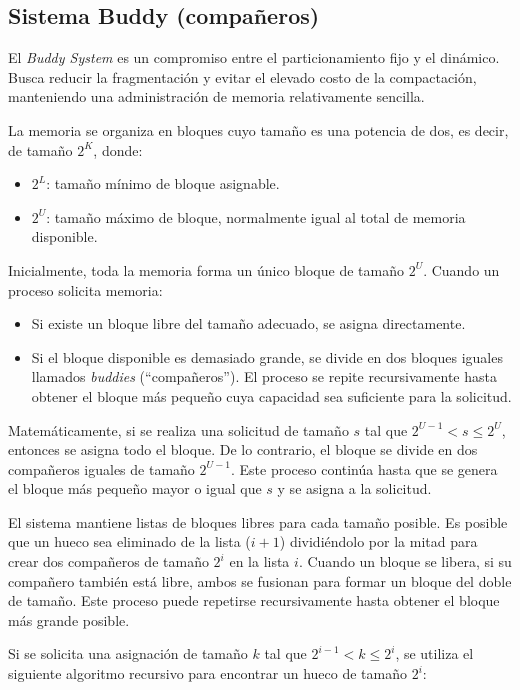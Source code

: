 \subsection{Sistema Buddy (compañeros)}

El \textit{Buddy System} es un compromiso entre el particionamiento fijo y el dinámico. Busca reducir la fragmentación y evitar el elevado costo de la compactación, manteniendo una administración de memoria relativamente sencilla.

La memoria se organiza en bloques cuyo tamaño es una potencia de dos, es decir, de tamaño \(2^K\), donde:
\begin{itemize}
  \item \(2^L\): tamaño mínimo de bloque asignable.
  \item \(2^U\): tamaño máximo de bloque, normalmente igual al total de memoria disponible.
\end{itemize}
Inicialmente, toda la memoria forma un único bloque de tamaño \(2^U\). Cuando un proceso solicita memoria:
\begin{itemize}
  \item Si existe un bloque libre del tamaño adecuado, se asigna directamente.
  \item Si el bloque disponible es demasiado grande, se divide en dos bloques iguales llamados \textit{buddies} (``compañeros''). El proceso se repite recursivamente hasta obtener el bloque más pequeño cuya capacidad sea suficiente para la solicitud.
\end{itemize}
Matemáticamente, si se realiza una solicitud de tamaño \(s\) tal que \(2^{U-1}<s\leq 2^U\), entonces se asigna todo el bloque. De lo contrario, el bloque se divide en dos compañeros iguales de tamaño \(2^{U-1}\). Este proceso continúa hasta que se genera el bloque más pequeño mayor o igual que \(s\) y se asigna a la solicitud.

El sistema mantiene listas de bloques libres para cada tamaño posible. Es posible que un hueco sea eliminado de la lista (\(i+1\)) dividiéndolo por la mitad para crear dos compañeros de tamaño \(2^i\) en la lista \(i\). Cuando un bloque se libera, si su compañero también está libre, ambos se fusionan para formar un bloque del doble de tamaño. Este proceso puede repetirse recursivamente hasta obtener el bloque más grande posible.

Si se solicita una asignación de tamaño \(k\) tal que \(2^{i-1}<k\leq 2^i\), se utiliza el siguiente algoritmo recursivo para encontrar un hueco de tamaño \(2^i\):

